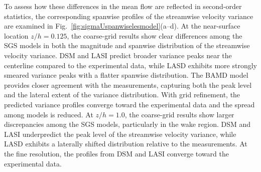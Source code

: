 \documentclass[%
superscriptaddress,
 amsmath,amssymb,
pra,
showkeys,
]{revtex4-2}
\begin{document}
To assess how these differences in the mean flow are reflected in second-order statistics, the corresponding spanwise profiles of the streamwise velocity variance are examined in Fig.~\ref{fig:sigmaUspanwiselesmodel}(a--d). At the near-surface location $z/h = 0.125$, the coarse-grid results show clear differences among the SGS models in both the magnitude and spanwise distribution of the streamwise velocity variance. DSM and LASI predict broader variance peaks near the centerline compared to the experimental data, while LASD exhibits more strongly smeared variance peaks with a flatter spanwise distribution. The BAMD model provides closer agreement with the measurements, capturing both the peak level and the lateral extent of the variance distribution. With grid refinement, the predicted variance profiles converge toward the experimental data and the spread among models is reduced. At $z/h = 1.0$, the coarse-grid results show larger discrepancies among the SGS models, particularly in the wake region. DSM and LASI underpredict the peak level of the streamwise velocity variance, while LASD exhibits a laterally shifted distribution relative to the measurements. At the fine resolution, the profiles from DSM and LASI converge toward the experimental data.
\end{document}
